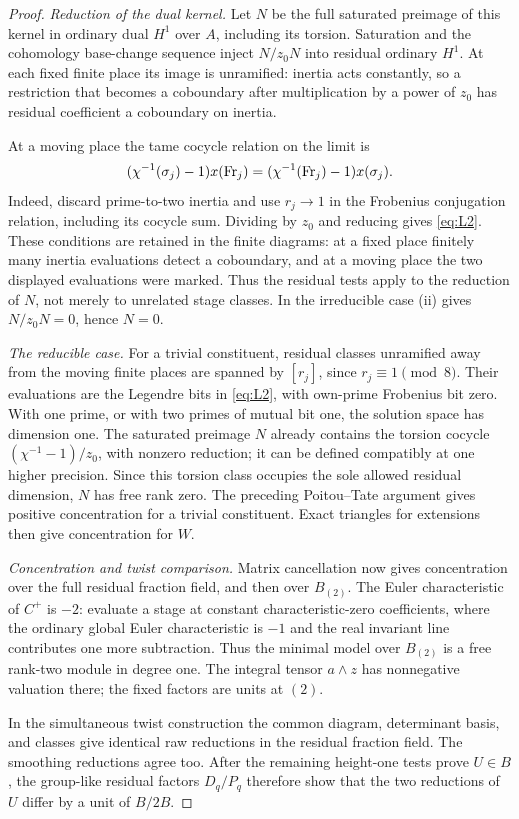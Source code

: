 \begin{proof}
\emph{Reduction of the dual kernel.}
Let $N$ be the full saturated preimage of this kernel in ordinary
dual $H^1$ over $A$, including its torsion. Saturation and the
cohomology base-change sequence inject $N/z_0N$ into residual
ordinary $H^1$. At each fixed finite place its image is unramified:
inertia acts constantly, so a restriction that becomes a coboundary
after multiplication by a power of $z_0$ has residual coefficient a
coboundary on inertia.

At a moving place the tame cocycle relation on the limit is
\[
 (\chi^{-1}(\sigma_j)-1)x({\rm Fr}_j)
   =(\chi^{-1}({\rm Fr}_j)-1)x(\sigma_j).
\]
Indeed, discard prime-to-two inertia and use $r_j\to1$ in the
Frobenius conjugation relation, including its cocycle sum. Dividing
by $z_0$ and reducing gives \eqref{eq:L2}. These conditions are retained in
the finite diagrams: at a fixed place finitely many inertia
evaluations detect a coboundary, and at a moving place the two
displayed evaluations were marked. Thus the residual tests apply
to the reduction of $N$, not merely to unrelated stage classes.
In the irreducible case (ii) gives $N/z_0N=0$, hence $N=0$.

\emph{The reducible case.}
For a trivial constituent, residual classes unramified away from
the moving finite places are spanned by $[r_j]$, since
$r_j\equiv1\pmod8$. Their evaluations are the Legendre bits in
\eqref{eq:L2}, with own-prime Frobenius bit zero. With one prime, or with
two primes of mutual bit one, the solution space has dimension
one. The saturated preimage $N$ already contains the torsion
cocycle $(\chi^{-1}-1)/z_0$, with nonzero reduction; it can be
defined compatibly at one higher precision. Since this torsion
class occupies the sole allowed residual dimension, $N$ has
free rank zero. The preceding Poitou--Tate argument gives
positive concentration for a trivial constituent. Exact
triangles for extensions then give concentration for $W$.

\emph{Concentration and twist comparison.}
Matrix cancellation now gives concentration over the full residual
fraction field, and then over $B_{(2)}$. The Euler characteristic
of $C^+$ is $-2$: evaluate a stage at constant characteristic-zero
coefficients, where the ordinary global Euler characteristic is
$-1$ and the real invariant line contributes one more subtraction.
Thus the minimal model over $B_{(2)}$ is a free rank-two module
in degree one. The integral tensor $a\wedge z$ has nonnegative
valuation there; the fixed factors are units at $(2)$.

In the simultaneous twist construction the common diagram,
determinant basis, and classes give identical raw reductions in
the residual fraction field. The smoothing reductions agree too.
After the remaining height-one tests prove $U\in B$, the
group-like residual factors $D_q/P_q$ therefore show that the
two reductions of $U$ differ by a unit of $B/2B$.

\end{proof}

